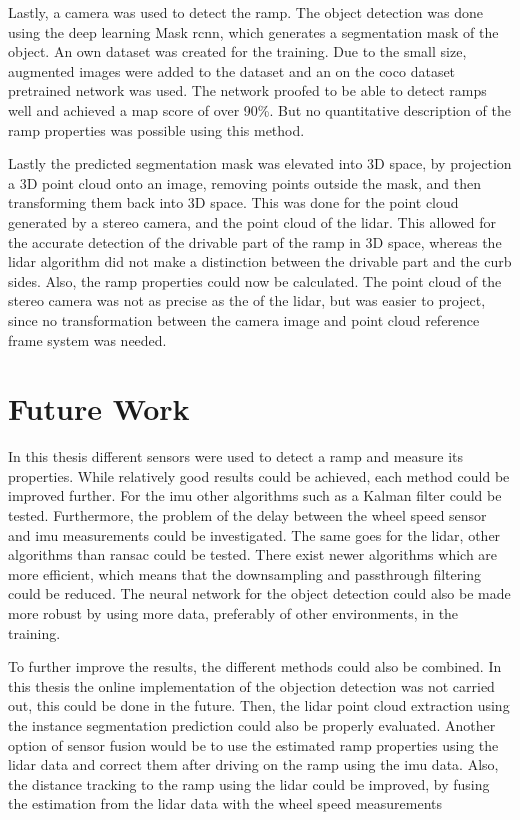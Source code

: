 Lastly, a camera was used to detect the ramp.
The object detection was done using the deep learning Mask \gls{rcnn}, which generates a segmentation mask of the object.
An own dataset was created for the training.
Due to the small size, augmented images were added to the dataset and an on the \gls{coco} dataset pretrained network was used.
The network proofed to be able to detect ramps well and achieved a \gls{map} score of over 90\%.
But no quantitative description of the ramp properties was possible using this method.

Lastly the predicted segmentation mask was elevated into 3D space, by projection a 3D point cloud onto an image, removing points outside the mask, and then transforming them back into 3D space.
This was done for the point cloud generated by a stereo camera, and the point cloud of the \gls{lidar}.
This allowed for the accurate detection of the drivable part of the ramp in 3D space, whereas the \gls{lidar} algorithm did not make a distinction between the drivable part and the curb sides.
Also, the ramp properties could now be calculated.
The point cloud of the stereo camera was not as precise as the of the \gls{lidar}, but was easier to project, since no transformation between the camera image and point cloud reference frame system was needed.



\section{Future Work}
In this thesis different sensors were used to detect a ramp and measure its properties.
While relatively good results could be achieved, each method could be improved further.
For the \gls{imu} other algorithms such as a Kalman filter could be tested.
Furthermore, the problem of the delay between the wheel speed sensor and \gls{imu} measurements could be investigated.
The same goes for the \gls{lidar}, other algorithms than \gls{ransac} could be tested.
There exist newer algorithms which are more efficient, which means that the downsampling and passthrough filtering could be reduced.
The neural network for the object detection could also be made more robust by using more data, preferably of other environments, in the training.

To further improve the results, the different methods could also be combined.
In this thesis the online implementation of the objection detection was not carried out, this could be done in the future.
Then, the \gls{lidar} point cloud extraction using the instance segmentation prediction could also be properly evaluated.
Another option of sensor fusion would be to use the estimated ramp properties using the \gls{lidar} data and correct them after driving on the ramp using the \gls{imu} data.
Also, the distance tracking to the ramp using the \gls{lidar} could be improved, by fusing the estimation from the \gls{lidar} data with the wheel speed measurements

